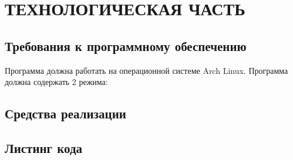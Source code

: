 \newpage
\section*{ТЕХНОЛОГИЧЕСКАЯ ЧАСТЬ}
\subsection*{Требования к программному обеспечению}

\begin{flushleft}
Программа должна работать на операционной системе Arch Linux. Программа должна
содержать 2 режима:
\end{flushleft}

\subsection*{Средства реализации}

\subsection*{Листинг кода}
